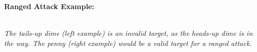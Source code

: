 \documentclass[12pt]{article}
\begin{document}
\begin{multicols*}{2}
\textbf{Ranged Attack Example:}
\begin{center}
\ \\
\emph{The tails-up dime (left example) is an invalid target, as the heads-up dime is in the way. The penny (right example) would be a valid target for a ranged attack.}
\end{center}


\end{multicols*}
\end{document}
